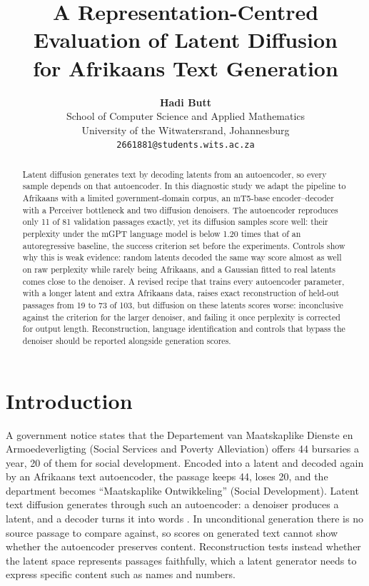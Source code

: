 \documentclass[11pt,a4paper]{article}
\title{A Representation-Centred Evaluation of Latent Diffusion\\for Afrikaans Text Generation}
\author{\textbf{Hadi Butt}\\
School of Computer Science and Applied Mathematics\\
University of the Witwatersrand, Johannesburg\\
\texttt{2661881@students.wits.ac.za}}
\date{}
\begin{document}
\maketitle

\begin{abstract}
Latent diffusion generates text by decoding latents from an autoencoder, so every sample depends on that autoencoder. In this diagnostic study we adapt the pipeline to Afrikaans with a limited government-domain corpus, an mT5-base encoder--decoder with a Perceiver bottleneck and two diffusion denoisers. The autoencoder reproduces only 11 of 81 validation passages exactly, yet its diffusion samples score well: their perplexity under the mGPT language model is below 1.20 times that of an autoregressive baseline, the success criterion set before the experiments. Controls show why this is weak evidence: random latents decoded the same way score almost as well on raw perplexity while rarely being Afrikaans, and a Gaussian fitted to real latents comes close to the denoiser. A revised recipe that trains every autoencoder parameter, with a longer latent and extra Afrikaans data, raises exact reconstruction of held-out passages from 19 to 73 of 103, but diffusion on these latents scores worse: inconclusive against the criterion for the larger denoiser, and failing it once perplexity is corrected for output length. Reconstruction, language identification and controls that bypass the denoiser should be reported alongside generation scores.
\end{abstract}

\section{Introduction}

A government notice states that the Departement van Maatskaplike Dienste en Armoedeverligting (Social Services and Poverty Alleviation) offers 44 bursaries a year, 20 of them for social development. Encoded into a latent and decoded again by an Afrikaans text autoencoder, the passage keeps 44, loses 20, and the department becomes ``Maatskaplike Ontwikkeling'' (Social Development). Latent text diffusion generates through such an autoencoder: a denoiser produces a latent, and a decoder turns it into words \citep{lovelace2023latent}. In unconditional generation there is no source passage to compare against, so scores on generated text cannot show whether the autoencoder preserves content. Reconstruction tests instead whether the latent space represents passages faithfully, which a latent generator needs to express specific content such as names and numbers.
\end{document}

